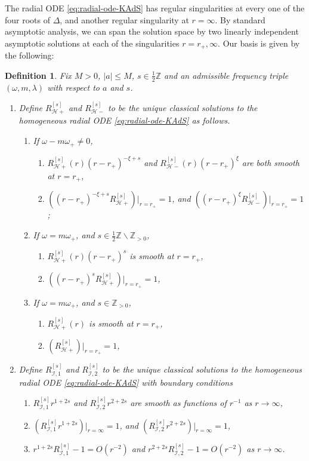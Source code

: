 \documentclass[11pt]{article}
\newtheorem{definition}[proposition]{Definition}
\newcommand{\cH}{\mathcal H}
\newcommand{\cI}{\mathcal I}
\numberwithin{equation}{section}
\begin{document}
The radial ODE \eqref{eq:radial-ode-KAdS} has regular singularities at every one of the four roots of $\Delta$, and another regular singularity at $r=\infty$. By standard asymptotic analysis, we can span the solution space by two linearly independent asymptotic solutions at each of the singularities $r=r_+,\infty$. Our basis is given by the following:
\begin{definition}\label{def:radial-basis-KAdS}
Fix $M>0$, $|a|\leq M$, $s\in \frac12\mathbb Z$ and an admissible frequency triple $(\omega,m,\lambda)$ with respect to $a$ and $s$.
\begin{enumerate}[label=\arabic*.]
\item Define $R^{[s]}_{\cH+}$ and $R^{[s]}_{\cH-}$ to be the unique classical solutions to the homogeneous radial ODE \eqref{eq:radial-ode-KAdS} as follows.
\begin{enumerate}[label=(\alph*)]
\item If $\omega-m\omega_+\neq 0$,
\begin{enumerate}[label=\roman*.]
\item $R^{[s]}_{\cH+}(r)(r-r_+)^{-\xi+s}$ and $R^{[s]}_{\cH-}(r)(r-r_+)^{\xi}$ are both smooth at $r=r_+$,
\item $\left((r-r_+)^{-\xi+s}R^{[s]}_{\cH+}\right)\big|_{r=r_+}=1$, and
 $\left((r-r_+)^{\xi}R^{[s]}_{\cH-}\right)\big|_{r=r_+}=1$;
\end{enumerate}
\item If $\omega=m\omega_+$, and $s\in \frac12\mathbb Z\backslash \mathbb Z_{> 0}$,
\begin{enumerate}[label=\roman*.]
\item $R^{[s]}_{\cH+}(r)(r-r_+)^{s}$ is smooth at $r=r_+$,
\item $\left((r-r_+)^{s}R^{[s]}_{\cH+}\right)\big|_{r=r_+}=1$,
\end{enumerate}
\item If $\omega=m\omega_+$, and $s\in \mathbb Z_{>0}$,
\begin{enumerate}[label=\roman*.]
\item $R^{[s]}_{\cH+}(r)$ is smooth at $r=r_+$,
\item $\left(R^{[s]}_{\cH+}\right)\big|_{r=r_+}=1$,
\end{enumerate}
\end{enumerate}
\item Define $R^{[s]}_{\cI,1}$ and $R^{[s]}_{\cI,2}$ to be the unique classical solutions to the homogeneous radial ODE \eqref{eq:radial-ode-KAdS} with boundary conditions
\begin{enumerate}[label=(\alph*)]
\item $R^{[s]}_{\cI,1}r^{1+2s}$ and  $R^{[s]}_{\cI,2}r^{2+2s}$ are smooth as functions of $r^{-1}$ as $r\to\infty$,
\item $\left(R^{[s]}_{\cI,1}r^{1+2s}\right)\big|_{r=\infty}=1$, and $\left(R^{[s]}_{\cI,2}r^{2+2s}\right)\big|_{r=\infty}=1$,
\item $r^{1+2s}R^{[s]}_{\cI,1}-1=O(r^{-2})$ and $r^{2+2s}R^{[s]}_{\cI,2}-1=O(r^{-2})$ as $r\to \infty$.
\end{enumerate}
\end{enumerate}
\end{definition}
\end{document}
